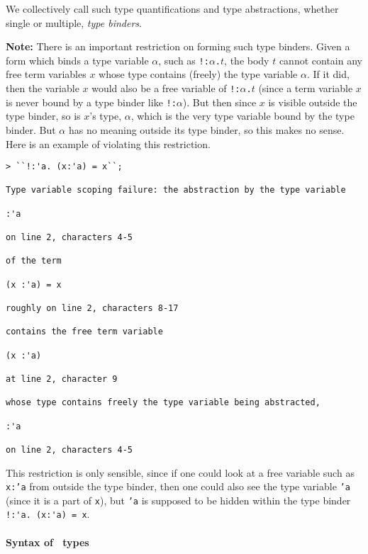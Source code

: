 We collectively call such type quantifications and type abstractions,
whether single or multiple, {\it type binders}.

{\bf Note:}
There is an important restriction on forming such type binders.
Given a form which binds a type variable $\alpha$,
such as {\small\verb|!:|}$\alpha${\small\verb|.|}$t$,
the body $t$ cannot contain any free term variables $x$
whose type contains (freely) the type variable $\alpha$.
If it did, then the variable $x$ would also be a free variable of
{\small\verb|!:|}$\alpha${\small\verb|.|}$t$ (since a term variable $x$
is never bound by a type binder like {\small\verb|!:|}$\alpha$). 
But then since $x$ is visible
outside the type binder, so is $x$'s type, $\alpha$, which is the very
type variable bound by the type binder.  But $\alpha$ has no meaning
outside its type binder, so this makes no sense.
%
Here is an example of violating this restriction.

\begin{session}
\begin{verbatim}
> ``!:'a. (x:'a) = x``;

Type variable scoping failure: the abstraction by the type variable

:'a

on line 2, characters 4-5

of the term

(x :'a) = x

roughly on line 2, characters 8-17

contains the free term variable

(x :'a)

at line 2, character 9

whose type contains freely the type variable being abstracted,

:'a

on line 2, characters 4-5
\end{verbatim}
\end{session}

This restriction is only sensible, since if one could look at a free variable
such as \texttt{x:'a} from outside the type binder, then one could also see
the type variable \texttt{'a} (since it is a part of \texttt{x}),
but \texttt{'a} is supposed to be hidden within the type binder
\verb|!:'a. (x:'a) = x|.

\paragraph{Syntax of \HOLW\ types}

